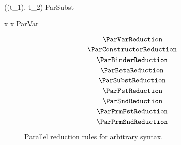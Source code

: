 \Rule{\ParSubstReduction}
    {
         \\
    }
    { \psi((t_1), t_2) \parred {}}
    {ParSubst}

\Rule{\ParVarReduction}
    {\color{white}{\_}}
    { x \parred x}
    {ParVar}

\begin{figure}
    \centering
    $$\ParVarReduction$$
    $$\ParConstructorReduction$$
    $$\ParBinderReduction$$
    $$\ParBetaReduction$$
    $$\ParSubstReduction$$
    $$\ParFstReduction$$
    $$\ParSndReduction$$
    $$\ParPrmFstReduction$$
    $$\ParPrmSndReduction$$
    \caption{Parallel reduction rules for arbitrary syntax.}
\end{figure}
